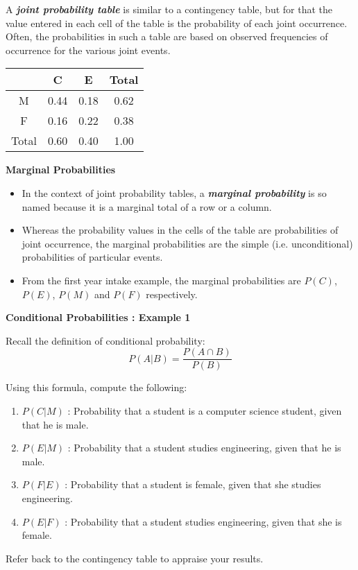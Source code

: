 \documentclass[]{report}
\begin{document}
{	A \textbf{\emph{joint probability table}} is similar to a contingency table, but for that the value entered in
	each cell of the table is the probability of each joint occurrence. Often, the probabilities in such a table are based
	on observed frequencies of occurrence for the various joint events.
	\begin{center}
		\begin{tabular}{|c||c|c||c|}
			\hline
			& C & E & Total \\ \hline \hline
			M & 0.44 & 0.18 & 0.62 \\ \hline
			F & 0.16 & 0.22 & 0.38 \\ \hline \hline
			Total & 0.60 & 0.40 & 1.00 \\ \hline
		\end{tabular}
	\end{center}
}
{
	\noindent \textbf{Marginal Probabilities}
	\begin{itemize}
		\item In the context of joint probability tables, a  \textbf{\emph{marginal probability}} is so named because it is a marginal total of
		a row or a column. \item Whereas the probability values in the cells of the table are probabilities of joint occurrence, the marginal
		probabilities are the simple (i.e. unconditional) probabilities of particular events.
		\item From the first year intake example, the marginal probabilities are $P(C)$, $P(E)$, $P(M)$ and $P(F)$ respectively.
	\end{itemize}
	
}
{
	\noindent \textbf{Conditional Probabilities : Example 1}
	
	Recall the definition of conditional probability:
	\[ P(A|B) = \frac{P(A \cap B)}{P(B)} \]
	
	Using this formula, compute the following:
	\begin{enumerate}
		\item $P(C|M)$ : Probability that a student is a computer science student, given that he is male.
		\item $P(E|M)$ : Probability that a student studies engineering, given that he is male.
		\item $P(F|E)$ : Probability that a student is female, given that she studies engineering.
		\item $P(E|F)$ : Probability that a student studies engineering, given that she is female.
	\end{enumerate}
	Refer back to the contingency table to appraise your results.
}
\end{document}

